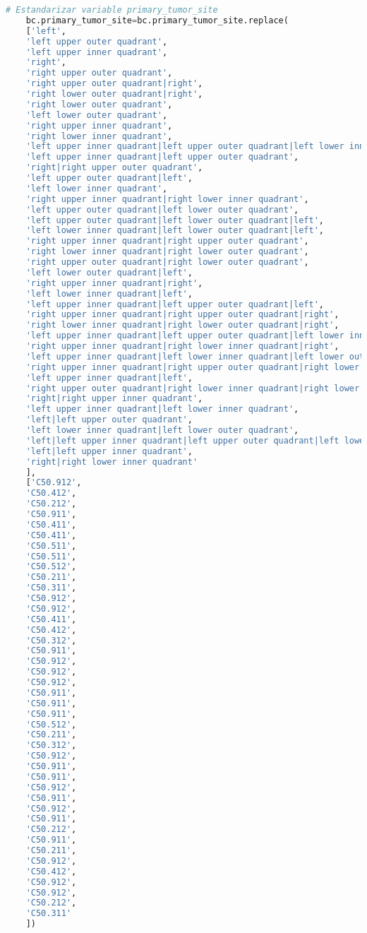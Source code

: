 \begin{lstlisting}[basicstyle=\scriptsize,language=Python, label=estandarizacion, caption=Estandarización de datos genómicos en Python.]
	# Estandarizar variable primary_tumor_site
	bc.primary_tumor_site=bc.primary_tumor_site.replace(
	['left',
	'left upper outer quadrant',
	'left upper inner quadrant',
	'right',
	'right upper outer quadrant',
	'right upper outer quadrant|right',
	'right lower outer quadrant|right',
	'right lower outer quadrant',
	'left lower outer quadrant',
	'right upper inner quadrant',
	'right lower inner quadrant',
	'left upper inner quadrant|left upper outer quadrant|left lower inner quadrant|left lower outer quadrant',
	'left upper inner quadrant|left upper outer quadrant',
	'right|right upper outer quadrant',
	'left upper outer quadrant|left',
	'left lower inner quadrant',
	'right upper inner quadrant|right lower inner quadrant',
	'left upper outer quadrant|left lower outer quadrant',
	'left upper outer quadrant|left lower outer quadrant|left',
	'left lower inner quadrant|left lower outer quadrant|left',
	'right upper inner quadrant|right upper outer quadrant',
	'right lower inner quadrant|right lower outer quadrant',
	'right upper outer quadrant|right lower outer quadrant',
	'left lower outer quadrant|left',
	'right upper inner quadrant|right',
	'left lower inner quadrant|left',
	'left upper inner quadrant|left upper outer quadrant|left',
	'right upper inner quadrant|right upper outer quadrant|right',
	'right lower inner quadrant|right lower outer quadrant|right',
	'left upper inner quadrant|left upper outer quadrant|left lower inner quadrant|left lower outer quadrant|left',
	'right upper inner quadrant|right lower inner quadrant|right',
	'left upper inner quadrant|left lower inner quadrant|left lower outer quadrant|left',
	'right upper inner quadrant|right upper outer quadrant|right lower inner quadrant|right lower outer quadrant|right',
	'left upper inner quadrant|left',
	'right upper outer quadrant|right lower inner quadrant|right lower outer quadrant',
	'right|right upper inner quadrant',
	'left upper inner quadrant|left lower inner quadrant',
	'left|left upper outer quadrant',
	'left lower inner quadrant|left lower outer quadrant',
	'left|left upper inner quadrant|left upper outer quadrant|left lower inner quadrant|left lower outer quadrant',
	'left|left upper inner quadrant',
	'right|right lower inner quadrant'
	],
	['C50.912',
	'C50.412',
	'C50.212',
	'C50.911',
	'C50.411',
	'C50.411',
	'C50.511',
	'C50.511',
	'C50.512',
	'C50.211',
	'C50.311',
	'C50.912',
	'C50.912',
	'C50.411',
	'C50.412',
	'C50.312',
	'C50.911',
	'C50.912',
	'C50.912',
	'C50.912',
	'C50.911',
	'C50.911',
	'C50.911',
	'C50.512',
	'C50.211',
	'C50.312',
	'C50.912',
	'C50.911',
	'C50.911',
	'C50.912',
	'C50.911',
	'C50.912',
	'C50.911',
	'C50.212',
	'C50.911',
	'C50.211',
	'C50.912',
	'C50.412',
	'C50.912',
	'C50.912',
	'C50.212',
	'C50.311'
	])

\end{lstlisting}


